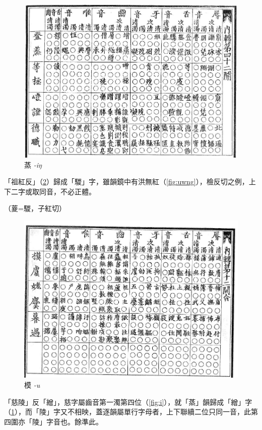 \documentclass[oneside,a4paper,11pt]{article}
\newcommand{\ipa}[1]{{\phon\textit{#1}}}
\newcommand{\zh}[1]{{\cn #1}}
\newcommand{\zhc}[2]{\zh{#1} \ipa{#2}}
\begin{document}
{\begin{figure}[H]
\centering
\label{fig:ing}
\caption{\zhc{蒸}{-iŋ}}
\includegraphics[width=\textwidth]{yunjing-ing.jpg}
\end{figure}

「祖紅反」（\ref{fig:u}）歸成「騣」字，雖韻鏡中有洪無紅（\ref{fig:uwng}），檢反切之例，上下二字或取同音，不必正體。

（葼=騣，子紅切）
\begin{figure}[H]
\centering
\label{fig:u}
\caption{\zhc{模}{-u}}
\includegraphics[width=.9\textwidth]{yunjing-u.jpg}
\end{figure}

「慈陵」反「繒」，慈字屬齒音第一濁第四位（\ref{fig:i}），就「蒸」韻歸成「繒」字（\ref{fig:ing}），而「陵」字又不相映，蓋逐韻屬單行字母者，上下聯續二位只同一音，此第四圍亦「陵」字音也。餘準此。

}
\end{document}
